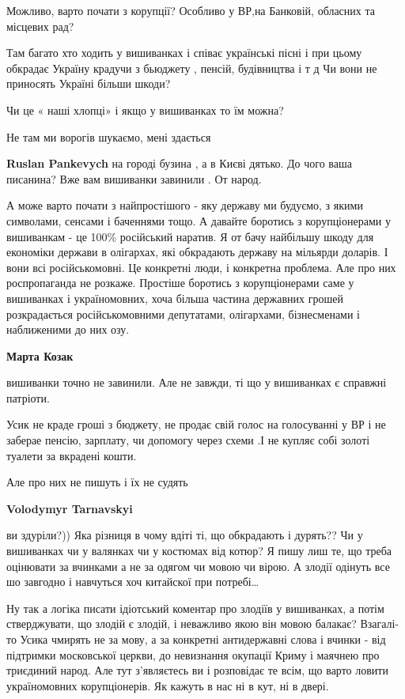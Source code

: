 \begin{itemize}

Можливо, варто почати з корупції? Особливо у ВР,на Банковій, обласних та
місцевих рад?

Там багато хто ходить у вишиванках і співає українські пісні і при цьому
обкрадає Україну крадучи з бьюджету , пенсій, будівництва і т д Чи вони не
приносять Україні більши шкоди?

Чи це « наші хлопці» і якщо у вишиванках то їм можна?

Не там ми ворогів шукаємо, мені здається

\begin{itemize} %
\textbf{Ruslan Pankevych} на городі бузина , а в Києві дятько. До чого ваша писанина? Вже вам вишиванки завинили . От народ.


А може варто почати з найпростішого - яку державу ми будуємо, з якими
символами, сенсами і баченнями тощо. А давайте боротись з корупціонерами у
вишиванкам - це 100\% російський наратив. Я от бачу найбільшу шкоду для
економіки держави в олігархах, які обкрадають державу на мільярди доларів. І
вони всі російськомовні. Це конкретні люди, і конкретна проблема. Але про них
роспропаганда не розкаже. Простіше боротись з корупціонерами саме у вишиванках
і україномовних, хоча більша частина державних грошей розкрадається
російськомовними депутатами, олігархами, бізнесменами і наближеними до них озу.

\textbf{Марта Козак} 

вишиванки точно не завинили. Але не завжди, ті що у вишиванках є справжні
патріоти.

Усик не краде гроші з бюджету, не продає свій голос на голосуванні у ВР і не
заберае пенсію, зарплату, чи допомогу через схеми .І не купляє собі золоті
туалети за вкрадені кошти.

Але про них не пишуть і їх не судять

\textbf{Volodymyr Tarnavskyi} 

ви здуріли?))
Яка різниця в чому вдіті ті, що обкрадають і дурять??
Чи у вишиванках чи у валянках чи у костюмах від котюр?
Я пишу лиш те, що треба оцінювати за вчинками а не за одягом чи мовою чи вірою.
А злодії одінуть все шо завгодно і навчуться хоч китайскої при потребі…


Ну так а логіка писати ідіотський коментар про злодіїв у вишиванках, а потім
стверджувати, що злодій є злодій, і неважливо якою він мовою балакає?
Взагалі-то Усика чмирять не за мову, а за конкретні антидержавні слова і вчинки
- від підтримки московської церкви, до невизнання окупації Криму і маячнею про
триєдиний народ. Але тут з'являєтесь ви і розповідає те всім, що варто ловити
україномовних корупціонерів. Як кажуть в нас ні в кут, ні в двері.


\end{itemize}
\end{itemize}
